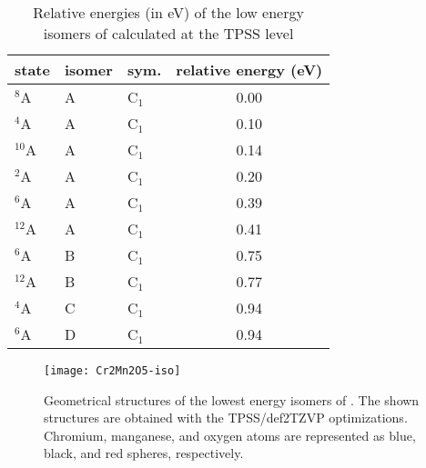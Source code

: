 \begin{table}[]
	\centering
	\caption{Relative energies (in eV) of the low energy isomers of  calculated at the TPSS level}
	\begin{tabular}{@{}lllc@{}}
	\toprule
	state & isomer & sym. & relative energy (eV) \\ \midrule
	$^8$A      & A      & C$_1$   & 0.00                 \\
	$^4$A      & A      & C$_1$   & 0.10                 \\
	$^{10}$A   & A      & C$_1$   & 0.14                 \\
	$^2$A      & A      & C$_1$   & 0.20                 \\
	$^6$A      & A      & C$_1$   & 0.39                 \\
	$^{12}$A   & A      & C$_1$   & 0.41                 \\
	$^6$A      & B      & C$_1$   & 0.75                 \\
	$^{12}$A   & B      & C$_1$   & 0.77                 \\
	$^4$A      & C      & C$_1$   & 0.94                 \\
	$^6$A      & D      & C$_1$   & 0.94                 \\ \bottomrule
	\end{tabular}
\end{table}



\begin{figure}
	\centering
	\texttt{[image: Cr2Mn2O5-iso]}
	\caption{Geometrical structures of the lowest energy isomers of . The shown structures are obtained with the TPSS/def2TZVP optimizations. Chromium, manganese, and oxygen atoms are represented as blue, black, and red spheres, respectively.}
	\label{figs:Cr2Mn2O5}
\end{figure}








